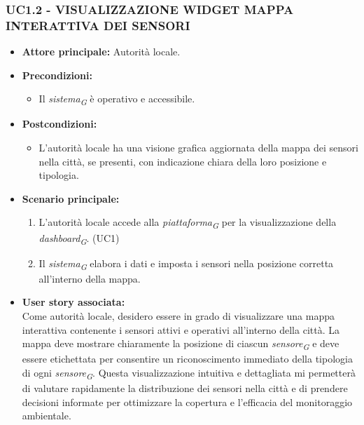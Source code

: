 \subsubsection{UC1.2 - VISUALIZZAZIONE WIDGET MAPPA INTERATTIVA DEI SENSORI}
\begin{itemize}
    \item \textbf{Attore principale:} Autorità locale.
    \item \textbf{Precondizioni:}
        \begin{itemize}
            \item  Il \textit{sistema}\textsubscript{\textit{G}} è operativo e accessibile.
        \end{itemize}
    \item \textbf{Postcondizioni:}
        \begin{itemize}
            \item L’autorità locale ha una visione grafica aggiornata della mappa dei sensori nella città, se presenti, con indicazione chiara della loro posizione e tipologia.
        \end{itemize}
    \item \textbf{Scenario principale:}
        \begin{enumerate}
            \item L'autorità locale accede alla \textit{piattaforma}\textsubscript{\textit{G}} per la visualizzazione della \textit{dashboard}\textsubscript{\textit{G}}. (UC1)
            \item Il \textit{sistema}\textsubscript{\textit{G}} elabora i dati e imposta i sensori nella posizione corretta all'interno della mappa.
        \end{enumerate}
    \item \textbf{User story associata:} \\
        Come autorità locale, desidero essere in grado di visualizzare una mappa interattiva contenente i sensori attivi e operativi all’interno della città. La mappa deve mostrare chiaramente la posizione di ciascun \textit{sensore}\textsubscript{\textit{G}} e deve essere etichettata per consentire un riconoscimento immediato della tipologia di ogni \textit{sensore}\textsubscript{\textit{G}}. Questa visualizzazione intuitiva e dettagliata mi permetterà di valutare rapidamente la distribuzione dei sensori nella città e di prendere decisioni informate per ottimizzare la copertura e l'efficacia del monitoraggio ambientale.
\end{itemize}